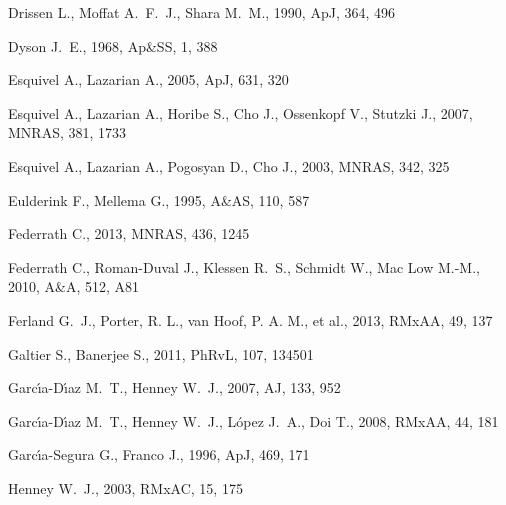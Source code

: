 \documentclass[useAMS,usenatbib]{mn2e}
\begin{document}
\begin{thebibliography}{}
 Drissen L., Moffat A.~F.~J., Shara M.~M., 1990, ApJ, 364, 496 

 Dyson J.~E., 1968, Ap\&SS, 1, 388 

 Esquivel A., Lazarian A., 2005, ApJ, 631, 320 

 Esquivel A., Lazarian A., Horibe S., Cho 
J., Ossenkopf V., Stutzki J., 2007, MNRAS, 381, 1733 

 Esquivel A., Lazarian A., Pogosyan D., Cho 
J., 2003, MNRAS, 342, 325 

 Eulderink F., Mellema G.,
  1995, A\&AS, 110, 587 

Federrath C., 2013, MNRAS, 436, 1245 

 Federrath C., Roman-Duval J., Klessen R.~S., Schmidt W., Mac Low M.-M., 2010, A\&A, 512, A81 

 Ferland G.~J., Porter, R. L., van
  Hoof, P. A. M., et al., 2013, RMxAA, 49, 137 

 Galtier S., Banerjee S., 2011, PhRvL, 107, 134501 

 Garc{\'{\i}}a-D{\'{\i}}az M.~T., Henney W.~J., 2007, AJ, 133, 952 

 Garc{\'{\i}}a-D{\'{\i}}az M.~T., Henney 
W.~J., L{\'o}pez J.~A., Doi T., 2008, RMxAA, 44, 181 

 Garc\'{\i}a-Segura G., Franco J., 1996, ApJ, 469, 171 

  Henney W.~J., 2003, RMxAC, 15, 175 


\end{thebibliography}
\end{document}
